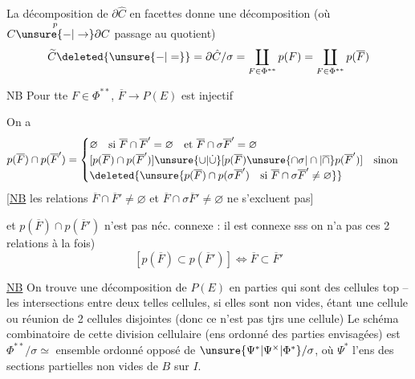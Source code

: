 La décomposition de $\partial\hat C$ en facettes donne une décomposition (où $C\overset{p}{\unsure{-|\to}}\partial C$ passage au quotient)
\[
\widetilde C\deleted{\unsure{-|=}}=\partial\hat C/\sigma
=\coprod_{F\in\Phi^{**}}p(F)=\coprod_{F\in\Phi^{**}}p(\overline F)
\]

NB Pour tte $F\in\Phi^{**}$, $\overline F\to P(E)$ est injectif

On a 
\[
p(\overline F)\cap p(\overline F')=
\begin{cases}
\varnothing\quad\text{si }\overline F\cap\overline F'=\varnothing\quad\text{et }\overline F\cap\sigma\overline F'=\varnothing\\
[p(\overline F)\cap p(\overline F')]\unsure{\cup|\mathbin{\dot\cup}}
[p(\overline F)\unsure{\cap\sigma|\cap|\overline{\cap}}p(\overline F')]\quad\text{sinon}\\
\deleted{\unsure{p(\overline F)\cap p(\sigma\overline F')\quad\text{si }\overline F\cap\sigma\overline F'\ne\varnothing}}
\end{cases}
\]
[\uline{NB} les relations $\overline F\cap\overline F'\ne\varnothing$ et $\overline F\cap\sigma\overline F'\ne\varnothing$ ne s'excluent pas]


et $p(\overline F)\cap p(\overline F')$ n'est pas néc. connexe : il est connexe sss  on n'a pas ces 2 relations à la fois)
\[
[p(\overline F)\subset p(\overline F')]\Longleftrightarrow\overline F\subset\overline F'
\]


\uline{NB} On trouve une décomposition de $P(E)$  en parties qui sont des cellules top -- les intersections entre deux telles cellules, si elles sont non vides, étant une cellule ou réunion de 2 cellules disjointes (donc ce n'est pas tjrs une cellule) Le schéma combinatoire de cette division cellulaire (ens ordonné des parties envisagées) est  $\Phi^{**}/\sigma\simeq$ ensemble ordonné opposé de $\unsure{\Psi^*|\Psi^\times|\Phi^*}/\sigma$, où $\Psi^*$  l'ens des sections partielles non vides de $B$ sur $I$.

